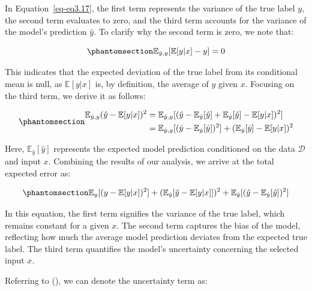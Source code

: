 \documentclass[
  letterpaper,
  numbers=noenddot,
  DIV=11]{scrreprt}
\theoremstyle{definition}
\theoremstyle{plain}
\theoremstyle{plain}
\theoremstyle{remark}
\begin{document}
In Equation~\ref{eq-eq3.17}, the first term represents the variance of
the true label \(y\), the second term evaluates to zero, and the third
term accounts for the variance of the model's prediction \(\hat{y}\). To
clarify why the second term is zero, we note that:

\begin{equation}\phantomsection\label{eq-eq3.18}{
\mathbb{E}_{\hat{y}, y}[\mathbb{E}[y|x] - y] = 0
}\end{equation}

This indicates that the expected deviation of the true label from its
conditional mean is null, as \(\mathbb{E}[y|x]\) is, by definition, the
average of \(y\) given \(x\). Focusing on the third term, we derive it
as follows:

\begin{equation}\phantomsection\label{eq-eq3.19}{\begin{aligned}
\mathbb{E}_{\hat{y}, y}(\hat{y} - \mathbb{E}[y|x])^2 &= \mathbb{E}_{\hat{y}, y}[(\hat{y} - \mathbb{E}_{\hat{y}}[\hat{y}] + \mathbb{E}_{\hat{y}}[\hat{y}] - \mathbb{E}[y|x])^2] \\
&= \mathbb{E}_{\hat{y}, y}[(\hat{y} - \mathbb{E}_{\hat{y}}[\hat{y}])^2] + (\mathbb{E}_{\hat{y}}[\hat{y}] - \mathbb{E}[y|x])^2
\end{aligned}}\end{equation}

Here, \(\mathbb{E}_{\hat{y}}[\hat{y}]\) represents the expected model
prediction conditioned on the data \(\mathcal{D}\) and input \(x\).
Combining the results of our analysis, we arrive at the total expected
error as:

\begin{equation}\phantomsection\label{eq-eq3.20}{
\mathbb{E}_{y} [(y - \mathbb{E}[y|x])^2] + (\mathbb{E}_{\hat{y}} [\hat{y} - \mathbb{E}[y|x]] )^2 + \mathbb{E}_{\hat{y}} [(\hat{y} - \mathbb{E}_{\hat{y}}[\hat{y}])^2]
}\end{equation}

In this equation, the first term signifies the variance of the true
label, which remains constant for a given \(x\). The second term
captures the bias of the model, reflecting how much the average model
prediction deviates from the expected true label. The third term
quantifies the model's uncertainty concerning the selected input \(x\).

Referring to (), we can denote the uncertainty term as:
\end{document}
